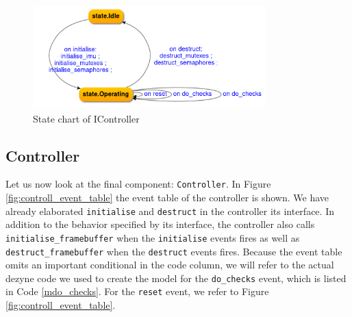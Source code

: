 \documentclass[12pt]{scrreprt}
\begin{document}
\begin{figure}[H]
    \centering
    \includegraphics[width=0.8\textwidth]{Figures/results/modelling_figures/IController/IController_state_chart.png}
    \caption{State chart of IController}
    \label{fig:IController_state_chart}
\end{figure}

\subsection{Controller}
Let us now look at the final component: \texttt{Controller}. In Figure \ref{fig:controll_event_table} the event table of the controller is shown. We have already elaborated \texttt{initialise} and \texttt{destruct} in the controller its interface. In addition to the behavior specified by its interface, the controller also calls \texttt{initialise\_framebuffer} when the \texttt{initialise} events fires as well as \texttt{destruct\_framebuffer} when the \texttt{destruct} events fires. Because the event table omits an important conditional in the code column, we will refer to the actual dezyne code we used to create the model for the \texttt{do\_checks} event, which is listed in Code \ref{mdo_checks}. For the \texttt{reset} event, we refer to Figure \ref{fig:controll_event_table}.
\par
\end{document}
